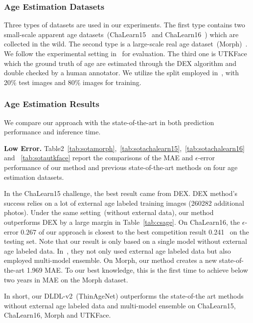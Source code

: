 \documentclass[5p,times,twocolumn]{elsarticle}
\begin{document}
\subsubsection{Age Estimation Datasets}
{Three} types of datasets are used in our experiments. The first type contains two small-scale apparent age datasets~(ChaLearn15~\cite{escalera2015chalearn} and ChaLearn16~\cite{escalera2016chalearn}) which are collected in the wild. The second type is a large-scale real age dataset~(Morph)~\cite{ricanek2006morph}. We follow the experimental setting in~\cite{gao2018dldlv2} for evaluation. {The third one is UTKFace~\cite{zhang2017age} which the ground truth of age are estimated through the DEX algorithm and double checked by a human annotator.} We utilize the split employed in~\cite{cao2020rank}, with 20\% test images and 80\% images for training. 


\subsubsection{Age Estimation Results}
We compare our approach with the state-of-the-art in both prediction performance and inference time. 

\textbf{Low Error.}
Table2~\ref{tab:sotamorph},~\ref{tab:sotachalearn15},~\ref{tab:sotachalearn16} and~
\ref{tab:sotautkface} report the comparisons of the MAE and $\epsilon$-error performance of our method and previous state-of-the-art methods on four age estimation datasets. 

In the ChaLearn15 challenge, the best result came from DEX. DEX method's success relies on a lot of external age labeled training images (260282 additional photos). Under the same setting~(without external data), our method outperforms DEX by a large margin in Table~\ref{tab:csage}.
On ChaLearn16, the $\epsilon$-error $0.267$ of our approach is closest to the best competition result 0.241~\cite{antipov2016apparent} on the testing set. Note that our result is only based on a single model without external age labeled data. In~\cite{antipov2016apparent}, they not only used external age labeled data but also employed multi-model ensemble. On Morph, our method creates a new state-of-the-art 1.969 MAE. To our best knowledge, this is the first time to achieve below two years in MAE on the Morph dataset. 

In short, our DLDL-v2~(ThinAgeNet) outperforms the state-of-the art methods without external age labeled data and multi-model ensemble on ChaLearn15, ChaLearn16, Morph and {UTKFace}.
\end{document}
